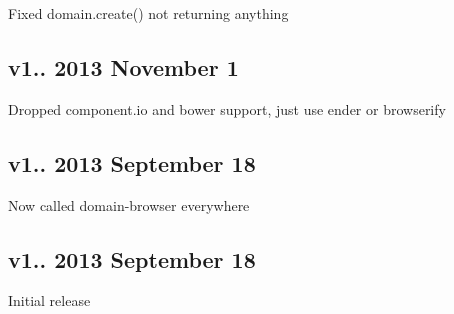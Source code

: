 \begin{DoxyItemize}
\item Fixed {\ttfamily domain.\+create()} not returning anything
\end{DoxyItemize}

\subsection*{v1.. 2013 November 1}


\begin{DoxyItemize}
\item Dropped component.\+io and bower support, just use ender or browserify
\end{DoxyItemize}

\subsection*{v1.. 2013 September 18}


\begin{DoxyItemize}
\item Now called {\ttfamily domain-\/browser} everywhere
\end{DoxyItemize}

\subsection*{v1.. 2013 September 18}


\begin{DoxyItemize}
\item Initial release 
\end{DoxyItemize}